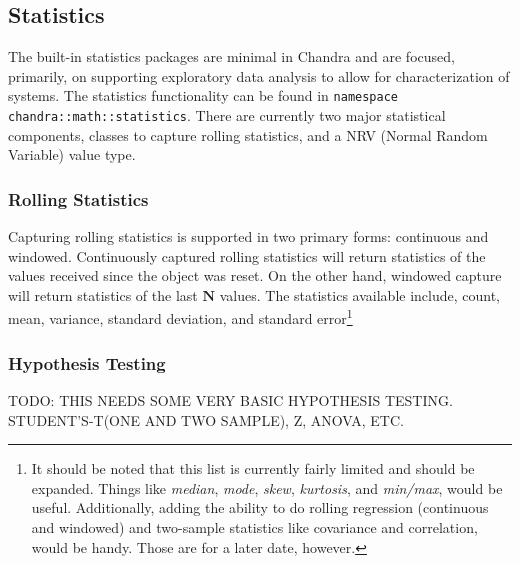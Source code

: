 \documentclass[10pt,letterpaper]{memoir} %
\begin{document}
\subsection{Statistics}
The built-in statistics packages are minimal in Chandra and are focused, primarily, on supporting exploratory data analysis to allow for characterization of systems.  The statistics functionality can be found in \texttt{namespace chandra::math::statistics}.  There are currently two major statistical components, classes to capture rolling statistics, and a NRV (Normal Random Variable) value type.

\subsubsection{Rolling Statistics}
Capturing rolling statistics is supported in two primary forms: continuous and windowed.  Continuously captured rolling statistics will return statistics of the values received since the object was reset.  On the other hand, windowed capture will return statistics of the last $\textbf{N}$ values.  The statistics available include, count, mean, variance, standard deviation, and standard error\footnote{It should be noted that this list is currently fairly limited and should be expanded.  Things like \emph{median}, \emph{mode}, \emph{skew}, \emph{kurtosis}, and \emph{min/max}, would be useful.  Additionally, adding the ability to do rolling regression (continuous and windowed) and two-sample statistics like covariance and correlation, would be handy.  Those are for a later date, however.} 

\subsubsection{Hypothesis Testing}
TODO: THIS NEEDS SOME VERY BASIC HYPOTHESIS TESTING. STUDENT'S-T(ONE AND TWO SAMPLE), Z, ANOVA, ETC.
 
\end{document}
